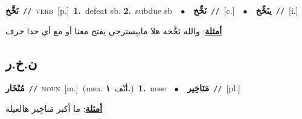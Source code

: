 \documentclass[10pt,a4paper,twoside]{article} %
\begin{document}
\begin{multicols}{2}
{\setlength\topsep{0pt}\textbf{\foreignlanguage{arabic}{نَخَّخ}}\ {\color{gray}\texttt{//}\color{black}}\ \textsc{verb}\ [p.]\ \textbf{1.}~defeat sb.  \textbf{2.}~subdue sb\ \ $\bullet$\ \ \setlength\topsep{0pt}\textbf{\foreignlanguage{arabic}{نَخِّخ}}\ {\color{gray}\texttt{//}\color{black}}\ [c.]\ \ $\bullet$\ \ \setlength\topsep{0pt}\textbf{\foreignlanguage{arabic}{ينَخِّخ}}\ {\color{gray}\texttt{//}\color{black}}\ [i.]\  \begin{flushright}\color{gray}\foreignlanguage{arabic}{\textbf{\underline{\foreignlanguage{arabic}{أمثلة}}}: والله نَخَّخه هلا مابيسترجي يفتح معنا أو مع أي حدا حرف}\end{flushright}\color{black}} \vspace{2mm}

\vspace{-3mm}
\subsection*{\color{blue}\foreignlanguage{arabic}{ن.خ.ر}\color{blue}{}} 

{\setlength\topsep{0pt}\textbf{\foreignlanguage{arabic}{مُنْخَار}}\ {\color{gray}\texttt{//}\color{black}}\ \textsc{noun}\ [m.]\ \color{gray}(msa. \foreignlanguage{arabic}{أنْف}~\foreignlanguage{arabic}{\textbf{١.}})\color{black}\ \textbf{1.}~nose\ \ $\bullet$\ \ \setlength\topsep{0pt}\textbf{\foreignlanguage{arabic}{مَنَاخِير}}\ {\color{gray}\texttt{//}\color{black}}\ [pl.]\  \begin{flushright}\color{gray}\foreignlanguage{arabic}{\textbf{\underline{\foreignlanguage{arabic}{أمثلة}}}: ما أكبر مَناخِير هالعيلة}\end{flushright}\color{black}} \vspace{2mm}


\end{multicols}
\end{document}

